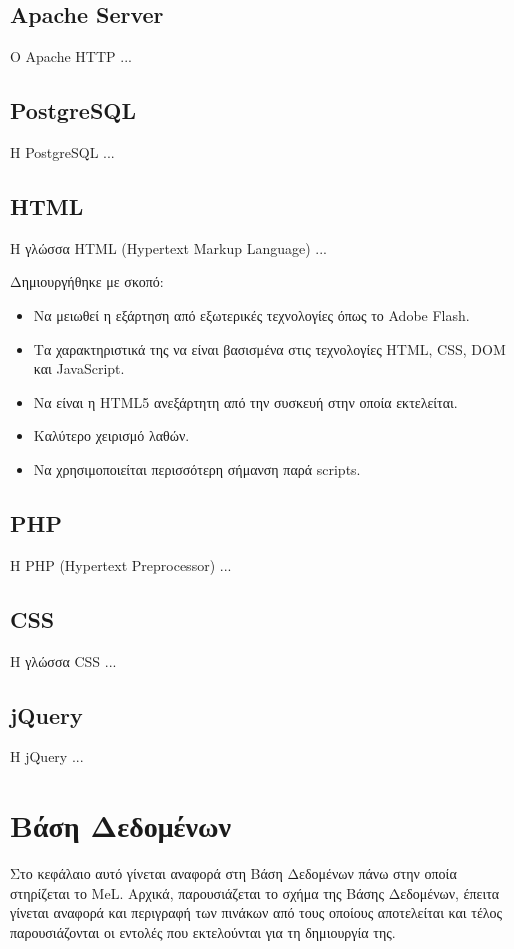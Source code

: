 \subsection{\textlatin{Apache Server}}
Ο \textlatin{Apache HTTP \cite{apache,apache_wiki}} ...

\subsection{\textlatin{PostgreSQL}}
Η \textlatin{PostgreSQL \cite{postgres}} ...

\subsection{\textlatin{HTML}}
Η γλώσσα \textlatin{HTML \cite{html} (Hypertext Markup Language)} ...

Δημιουργήθηκε με σκοπό: 
\begin{itemize}
\item
 Να μειωθεί η εξάρτηση από εξωτερικές τεχνολογίες όπως το \textlatin{Adobe Flash.} 
\item
 Τα χαρακτηριστικά της να είναι βασισμένα στις τεχνολογίες \textlatin{HTML, CSS, DOM} και \textlatin{JavaScript.} 
\item
 Να είναι η \textlatin{HTML5} ανεξάρτητη από την συσκευή στην οποία εκτελείται.
\item
 Καλύτερο χειρισμό λαθών. 
\item
 Να χρησιμοποιείται περισσότερη σήμανση παρά \textlatin{scripts.} 
\end{itemize}


\subsection{\textlatin{PHP}}
Η \textlatin{PHP (Hypertext Preprocessor)} \cite{www11} ...

\subsection{\textlatin{CSS}}
Η γλώσσα \textlatin{CSS} \cite{www11} ...

\subsection{\textlatin{jQuery}}
Η \textlatin{jQuery \cite{jquery}} ...


\section{Βάση Δεδομένων}
Στο κεφάλαιο αυτό γίνεται αναφορά στη Βάση Δεδομένων πάνω στην οποία στηρίζεται το \textlatin{MeL}.  Αρχικά, παρουσιάζεται το σχήμα της Βάσης Δεδομένων, έπειτα γίνεται αναφορά και περιγραφή των πινάκων από τους οποίους αποτελείται και τέλος παρουσιάζονται οι εντολές που εκτελούνται για τη δημιουργία της.

